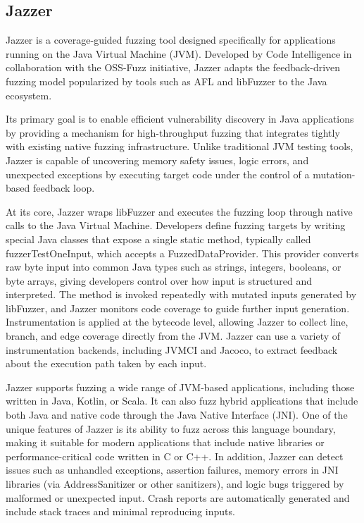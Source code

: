 \subsection{Jazzer}

Jazzer is a coverage-guided fuzzing tool designed specifically for applications running on the Java Virtual Machine (JVM). 
Developed by Code Intelligence in collaboration with the OSS-Fuzz initiative, Jazzer adapts the feedback-driven fuzzing model popularized by tools such as AFL and libFuzzer to the Java ecosystem. 

Its primary goal is to enable efficient vulnerability discovery in Java applications by providing a mechanism for high-throughput fuzzing that integrates tightly with existing native fuzzing infrastructure. 
Unlike traditional JVM testing tools, Jazzer is capable of uncovering memory safety issues, logic errors, and unexpected exceptions by executing target code under the control of a mutation-based feedback loop.

At its core, Jazzer wraps libFuzzer and executes the fuzzing loop through native calls to the Java Virtual Machine. 
Developers define fuzzing targets by writing special Java classes that expose a single static method, typically called fuzzerTestOneInput, which accepts a FuzzedDataProvider. 
This provider converts raw byte input into common Java types such as strings, integers, booleans, or byte arrays, giving developers control over how input is structured and interpreted. 
The method is invoked repeatedly with mutated inputs generated by libFuzzer, and Jazzer monitors code coverage to guide further input generation. 
Instrumentation is applied at the bytecode level, allowing Jazzer to collect line, branch, and edge coverage directly from the JVM. 
Jazzer can use a variety of instrumentation backends, including JVMCI and Jacoco, to extract feedback about the execution path taken by each input.

Jazzer supports fuzzing a wide range of JVM-based applications, including those written in Java, Kotlin, or Scala. 
It can also fuzz hybrid applications that include both Java and native code through the Java Native Interface (JNI). 
One of the unique features of Jazzer is its ability to fuzz across this language boundary, making it suitable for modern applications that include native libraries or performance-critical code written in C or C++. 
In addition, Jazzer can detect issues such as unhandled exceptions, assertion failures, memory errors in JNI libraries (via AddressSanitizer or other sanitizers), and logic bugs triggered by malformed or unexpected input. 
Crash reports are automatically generated and include stack traces and minimal reproducing inputs.

